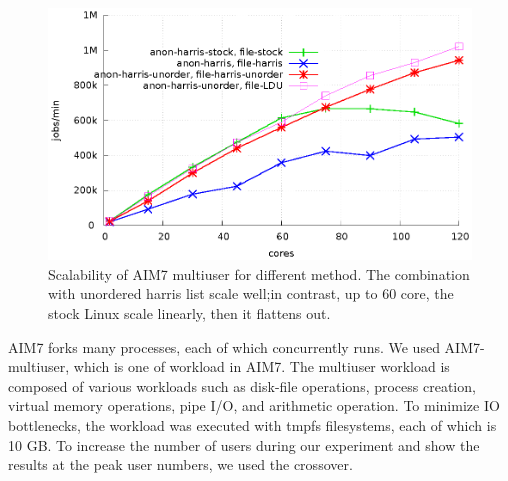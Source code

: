 
\begin{figure}[tb]
  \begin{center}
    \includegraphics[scale=0.65]{graph/aim7.eps}
  \end{center}
  \caption{Scalability of AIM7 multiuser for different method.  The combination
   with unordered harris list scale well;in contrast, up to 60 core, the
  stock Linux scale linearly, then it  flattens out.}
  \label{fig:aim7}
\end{figure}

AIM7 forks many processes, each of which concurrently runs. 
We used AIM7-multiuser, which is one of workload in AIM7.
The multiuser workload is composed of various workloads such as disk-file
operations, process creation, virtual memory operations, pipe I/O, and
arithmetic operation.
To minimize IO bottlenecks, the workload was executed with tmpfs filesystems, each
of which is 10 GB.
To increase the number of users during our experiment and show the results at the
peak user numbers, 
we used the crossover.


